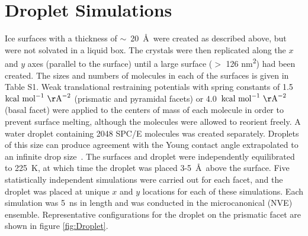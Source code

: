 \section{Droplet Simulations}
Ice surfaces with a thickness of $\sim$~20~\AA\ were created as
described above, but were not solvated in a liquid box. The crystals
were then replicated along the $x$ and $y$ axes (parallel to the
surface) until a large surface ($>$ 126 nm\textsuperscript{2}) had
been created.  The sizes and numbers of molecules in each of the
surfaces is given in Table S1.  Weak translational restraining
potentials with spring constants of 1.5~$\mathrm{kcal\
  mol}^{-1}\mathrm{~\AA}^{-2}$ (prismatic and pyramidal facets) or
4.0~$\mathrm{kcal\ mol}^{-1}\mathrm{~\AA}^{-2}$ (basal facet) were
applied to the centers of mass of each molecule in order to prevent
surface melting, although the molecules were allowed to reorient
freely. A water droplet containing 2048 SPC/E molecules was created
separately. Droplets of this size can produce agreement with the Young
contact angle extrapolated to an infinite drop size~\cite{Daub2010}. The
surfaces and droplet were independently equilibrated to 225~K, at
which time the droplet was placed 3-5~\AA\ above the surface.  Five
statistically independent simulations were carried out for each facet,
and the droplet was placed at unique $x$ and $y$ locations for each of
these simulations.  Each simulation was 5~ns in length and was
conducted in the microcanonical (NVE) ensemble.  Representative
configurations for the droplet on the prismatic facet are shown in
figure \ref{fig:Droplet}.



